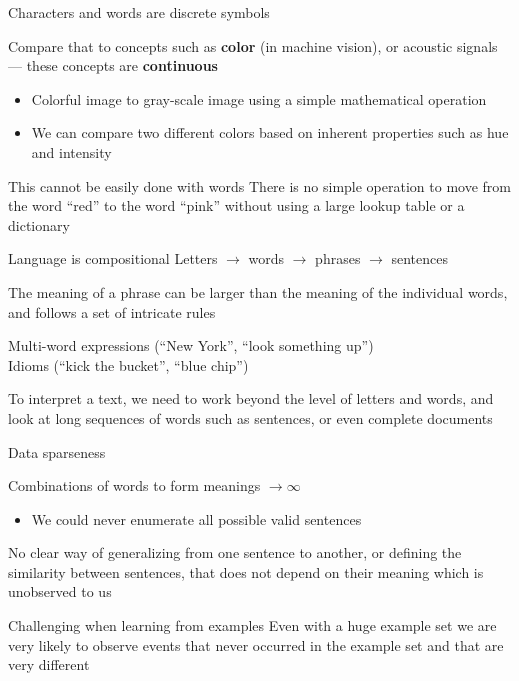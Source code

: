 \documentclass[12pt,aspectratio=169,handout]{beamer}
\begin{document}
\begin{frame}{Characters and words are discrete symbols}
	
	Compare that to concepts such as \textbf{color} (in machine vision), or acoustic
	signals --- these concepts are \textbf{continuous}
	
	\begin{itemize}
		\item Colorful image to gray-scale image using a simple mathematical operation
		\item We can compare two different colors based on inherent properties such as hue and intensity
	\end{itemize}
	
	\begin{block}{This cannot be easily done with words}
		There is no simple operation to move from the word ``red'' to the word ``pink'' without using a large lookup table or a dictionary
	\end{block}
	
\end{frame}


\begin{frame}{Language is compositional}
	Letters $\to$ words $\to$ phrases $\to$ sentences
	
	The meaning of a phrase can be larger than the meaning of the individual words,	and follows a set of intricate rules
	
	\begin{example}
		Multi-word expressions (``New York'', ``look something up'') \\
		Idioms (``kick the bucket'', ``blue chip'')
	\end{example}
	
	To interpret a text, we need to work beyond the level of letters and words, and look at long sequences of words such as sentences, or even complete documents
\end{frame}


\begin{frame}{Data sparseness}
	
	Combinations of words to form meanings $\to \infty$
	
	\begin{itemize}
		\item We could never enumerate all possible valid sentences
	\end{itemize}
	
	
	No clear way of generalizing from one sentence to another, or defining the similarity between sentences, that does not depend on their meaning which is unobserved to us
	
	
	\begin{block}{Challenging when learning from examples}
		Even with a huge example set we are very likely to observe events that never occurred in the example set and that are very different
	\end{block}
	
\end{frame}
\end{document}
